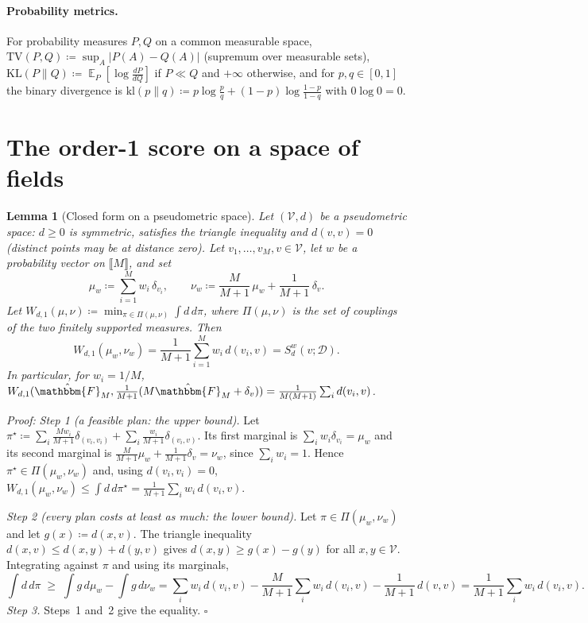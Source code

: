 \documentclass{article}
\DeclareMathOperator{\E}{\mathbb{E}}
\newcommand{\cV}{\mathcal{V}}                       %
\newcommand{\cD}{\mathcal{D}}                       %
\newcommand{\TV}{\mathrm{TV}}
\newcommand{\KL}{\mathrm{KL}}
\newcommand{\kl}{\mathrm{kl}}
\theoremstyle{plain}
\newtheorem{lemma}{Lemma}
\begin{document}
\paragraph{Probability metrics.}
For probability measures $P,Q$ on a common measurable space,
$\TV(P,Q)\coloneqq\sup_A|P(A)-Q(A)|$ (supremum over measurable sets),
$\KL(P\|Q)\coloneqq\E_P[\log\tfrac{dP}{dQ}]$ if $P\ll Q$ and $+\infty$ otherwise, and for
$p,q\in[0,1]$ the binary divergence is
$\kl(p\|q)\coloneqq p\log\tfrac{p}{q}+(1-p)\log\tfrac{1-p}{1-q}$ with $0\log0=0$.

\section{The order-1 score on a space of fields}\label{sec:score}

\begin{lemma}[Closed form on a pseudometric space]\label{lem:closed_form}
Let $(\cV,d)$ be a pseudometric space: $d\geq0$ is symmetric, satisfies the triangle
inequality and $d(v,v)=0$ (distinct points may be at distance zero). Let
$v_1,\dots,v_M,v\in\cV$, let $w$ be a probability vector on $\llbracket M\rrbracket$, and set
\[
  \mu_w\coloneqq\sum_{i=1}^M w_i\,\delta_{v_i},
  \qquad
  \nu_w\coloneqq\frac{M}{M+1}\,\mu_w+\frac{1}{M+1}\,\delta_{v}.
\]
Let $W_{d,1}(\mu,\nu)\coloneqq\min_{\pi\in\Pi(\mu,\nu)}\int d\,d\pi$, where $\Pi(\mu,\nu)$ is the
set of couplings of the two finitely supported measures. Then
\[
  W_{d,1}(\mu_w,\nu_w)=\frac{1}{M+1}\sum_{i=1}^M w_i\,d(v_i,v)=S^w_d(v;\cD).
\]
In particular, for $w_i=1/M$, $W_{d,1}(\hat{\mathbbm{F}}_M,\frac{1}{M+1}(M\hat{\mathbbm{F}}_M+\delta_v))=\frac{1}{M(M+1)}\sum_i d(v_i,v)$.
\end{lemma}
\textit{Proof:}
\emph{Step 1 (a feasible plan: the upper bound).} Let
$\pi^\star\coloneqq\sum_i\frac{Mw_i}{M+1}\delta_{(v_i,v_i)}+\sum_i\frac{w_i}{M+1}\delta_{(v_i,v)}$.
Its first marginal is $\sum_i w_i\delta_{v_i}=\mu_w$ and its second marginal is
$\frac{M}{M+1}\mu_w+\frac{1}{M+1}\delta_v=\nu_w$, since $\sum_iw_i=1$. Hence
$\pi^\star\in\Pi(\mu_w,\nu_w)$ and, using $d(v_i,v_i)=0$,
$W_{d,1}(\mu_w,\nu_w)\leq\int d\,d\pi^\star=\frac{1}{M+1}\sum_iw_i\,d(v_i,v)$.

\emph{Step 2 (every plan costs at least as much: the lower bound).} Let $\pi\in\Pi(\mu_w,\nu_w)$
and let $g(x)\coloneqq d(x,v)$. The triangle inequality $d(x,v)\leq d(x,y)+d(y,v)$ gives
$d(x,y)\geq g(x)-g(y)$ for all $x,y\in\cV$. Integrating against $\pi$ and using its marginals,
\[
  \int d\,d\pi\;\geq\;\int g\,d\mu_w-\int g\,d\nu_w
  =\sum_iw_i\,d(v_i,v)-\frac{M}{M+1}\sum_iw_i\,d(v_i,v)-\frac{1}{M+1}\,d(v,v)
  =\frac{1}{M+1}\sum_iw_i\,d(v_i,v).
\]
\emph{Step 3.} Steps~1 and~2 give the equality. \hfill $\square$
\end{document}
